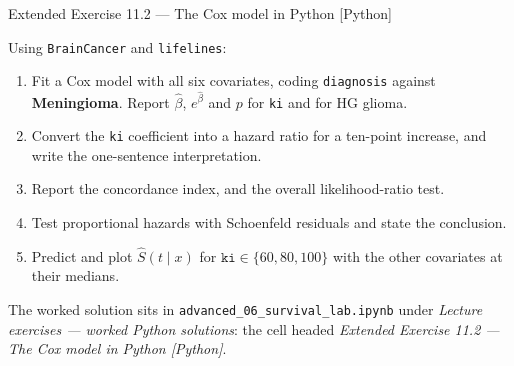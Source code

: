 \documentclass[aspectratio=169,11pt]{beamer}
\begin{document}
\begin{frame}{Extended Exercise 11.2 --- The Cox model in Python [Python]}
\begin{longexercise}
  Using \texttt{BrainCancer} and \texttt{lifelines}:
  \begin{enumerate}
    \item Fit a Cox model with all six covariates, coding \texttt{diagnosis} against
          \textbf{Meningioma}. Report $\hat\beta$, $e^{\hat\beta}$ and $p$ for
          \texttt{ki} and for HG glioma.
    \item Convert the \texttt{ki} coefficient into a hazard ratio for a ten-point
          increase, and write the one-sentence interpretation.
    \item Report the concordance index, and the overall likelihood-ratio test.
    \item Test proportional hazards with Schoenfeld residuals and state the conclusion.
    \item Predict and plot $\hat S(t\mid x)$ for $\texttt{ki}\in\{60,80,100\}$ with the
          other covariates at their medians.
  \end{enumerate}
\end{longexercise}
\begin{labnote}
  The worked solution sits in \texttt{advanced\_06\_survival\_lab.ipynb} under
  \emph{Lecture exercises --- worked Python solutions}: the cell headed
  \emph{Extended Exercise 11.2 --- The Cox model in Python [Python]}.
\end{labnote}
\end{frame}
\end{document}
